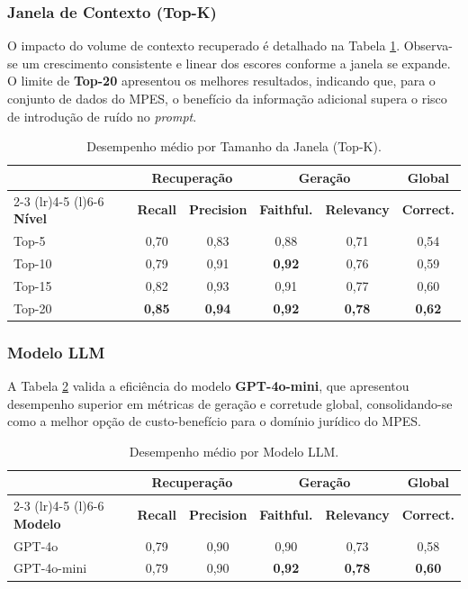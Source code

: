 \subsubsection{Janela de Contexto (Top-K)}

O impacto do volume de contexto recuperado é detalhado na Tabela \ref{tab:topk_results}. Observa-se um crescimento consistente e linear dos escores conforme a janela se expande. O limite de \textbf{Top-20} apresentou os melhores resultados, indicando que, para o conjunto de dados do MPES, o benefício da informação adicional supera o risco de introdução de ruído no \textit{prompt}.

\begin{table}[ht]
  \centering
  \caption{Desempenho médio por Tamanho da Janela (Top-K).}
  \label{tab:topk_results}
  \small
  \begin{tabular}{lccccc}
    \toprule
    & \multicolumn{2}{c}{\textbf{Recuperação}} & \multicolumn{2}{c}{\textbf{Geração}} & \textbf{Global} \\ \cmidrule(lr){2-3} \cmidrule(lr){4-5} \cmidrule(l){6-6}
    \textbf{Nível} & \textbf{Recall} & \textbf{Precision} & \textbf{Faithful.} & \textbf{Relevancy} & \textbf{Correct.} \\ \midrule
    Top-5  & 0,70 & 0,83 & 0,88 & 0,71 & 0,54 \\
    Top-10 & 0,79 & 0,91 & \textbf{0,92} & 0,76 & 0,59 \\
    Top-15 & 0,82 & 0,93 & 0,91 & 0,77 & 0,60 \\
    Top-20 & \textbf{0,85} & \textbf{0,94} & \textbf{0,92} & \textbf{0,78} & \textbf{0,62} \\ \bottomrule
  \end{tabular}
\end{table}
\subsubsection{Modelo LLM}

A Tabela \ref{tab:model_results} valida a eficiência do modelo \textbf{GPT-4o-mini}, que apresentou desempenho superior em métricas de geração e corretude global, consolidando-se como a melhor opção de custo-benefício para o domínio jurídico do MPES.

\begin{table}[h]
  \centering
  \caption{Desempenho médio por Modelo LLM.}
  \label{tab:model_results}
  \small
  \begin{tabular}{lccccc}
    \toprule
    & \multicolumn{2}{c}{\textbf{Recuperação}} & \multicolumn{2}{c}{\textbf{Geração}} & \textbf{Global} \\ \cmidrule(lr){2-3} \cmidrule(lr){4-5} \cmidrule(l){6-6}
    \textbf{Modelo} & \textbf{Recall} & \textbf{Precision} & \textbf{Faithful.} & \textbf{Relevancy} & \textbf{Correct.} \\ \midrule
    GPT-4o      & 0,79 & 0,90 & 0,90 & 0,73 & 0,58 \\
    GPT-4o-mini & 0,79 & 0,90 & \textbf{0,92} & \textbf{0,78} & \textbf{0,60} \\ \bottomrule
  \end{tabular}
\end{table}
